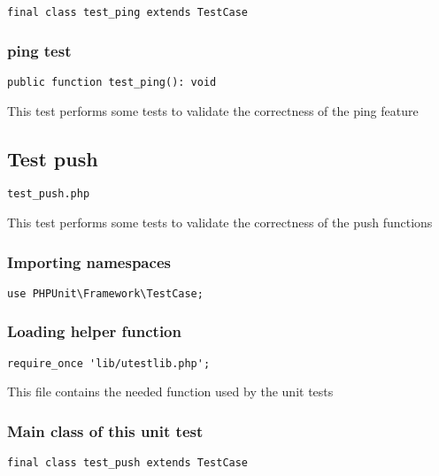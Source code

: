 \documentclass[a4paper]{article}
\begin{document}
\begin{lstlisting}
final class test_ping extends TestCase
\end{lstlisting}

\hypertarget{toc305}{}
\subsubsection{ping test}

\begin{lstlisting}
public function test_ping(): void
\end{lstlisting}

This test performs some tests to validate the correctness
of the ping feature

\hypertarget{toc306}{}
\subsection{Test push}

\begin{lstlisting}
test_push.php
\end{lstlisting}

This test performs some tests to validate the correctness
of the push functions

\hypertarget{toc307}{}
\subsubsection{Importing namespaces}

\begin{lstlisting}
use PHPUnit\Framework\TestCase;
\end{lstlisting}

\hypertarget{toc308}{}
\subsubsection{Loading helper function}

\begin{lstlisting}
require_once 'lib/utestlib.php';
\end{lstlisting}

This file contains the needed function used by the unit tests

\hypertarget{toc309}{}
\subsubsection{Main class of this unit test}

\begin{lstlisting}
final class test_push extends TestCase
\end{lstlisting}
\end{document}
